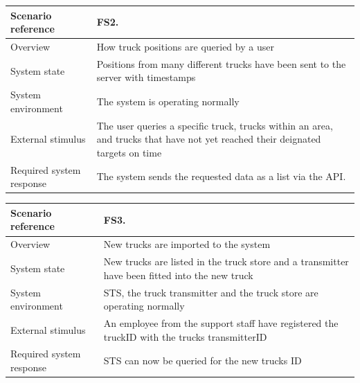 \documentclass[a4paper,11pt]{report}
\begin{document}
\begin{center}
  \begin{tabular}[h!]{| >{\columncolor{gray}}p{} | p{} |}
    \hline
    Scenario reference & FS2. \\
    \hline
    Overview & How truck positions are queried by a user \\
    \hline
    System state & Positions from many different trucks have been sent to the server with timestamps\\
    \hline
    System environment & The system is operating normally\\
    \hline
    External stimulus & The user queries a specific truck, trucks within an area, and trucks that have not yet reached their deignated targets on time\\
    \hline
    Required system response & The system sends the requested data as a list via the API. \\
    \hline
  \end{tabular}
\end{center}

\begin{center}
  \begin{tabular}[h!]{| >{\columncolor{gray}}p{} | p{} |}
    \hline
    Scenario reference & FS3. \\
    \hline
    Overview & New trucks are imported to the system \\
    \hline
    System state & New trucks are listed in the truck store and a transmitter have been fitted into the new truck\\
    \hline
    System environment & STS, the truck transmitter and the truck store are operating normally\\
    \hline
    External stimulus & An employee from the support staff have registered the truckID with the trucks transmitterID \\
    \hline
    Required system response & STS can now be queried for the new trucks ID \\
    \hline
  \end{tabular}
\end{center}
\end{document}
